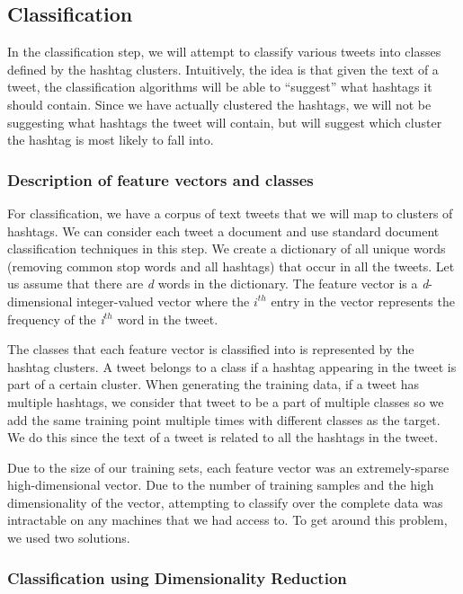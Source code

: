 \subsection{Classification}
\setcounter{secnumdepth}{4}

In the classification step, we will attempt to classify various tweets into classes defined by the hashtag clusters. Intuitively, the idea is that given the text of a tweet, the classification algorithms will be able to ``suggest'' what hashtags it should contain. Since we have actually clustered the hashtags, we will not be suggesting what hashtags the tweet will contain, but will suggest which cluster the hashtag is most likely to fall into.  

\subsubsection{Description of feature vectors and classes}
For classification, we have a corpus of text tweets that we will map to clusters of hashtags. We can consider each tweet a document and use standard document classification techniques in this step. We create a dictionary of all unique words (removing common stop words and all hashtags) that occur in all the tweets. Let us assume that there are {\it d} words in the dictionary.  
The feature vector is a {\it d}-dimensional integer-valued vector where the {\it $i^{th}$} entry in the vector represents the frequency of the {\it i$^{th}$} word in the tweet.

The classes that each feature vector is classified into is represented by the hashtag clusters. A tweet belongs to a class if a hashtag appearing in the tweet is part of a certain cluster. When generating the training data, if a tweet has multiple hashtags, we consider that tweet to be a part of multiple classes so we add the same training point multiple times with different classes as the target. We do this since the text of a tweet is related to all the hashtags in the tweet.  

Due to the size of our training sets, each feature vector was an extremely-sparse high-dimensional vector. Due to the number of training samples and the high dimensionality of the vector, attempting to classify over the complete data was intractable on any machines that we had access to. To get around this problem, we used two solutions.


\subsubsection{Classification using Dimensionality Reduction}

